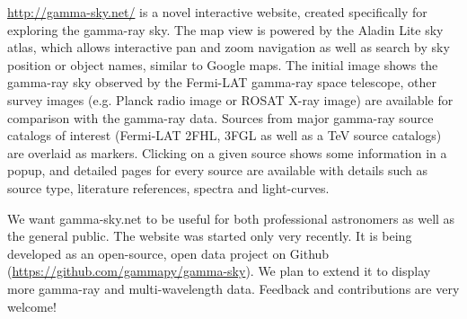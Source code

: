 \url{http://gamma-sky.net/} is a novel interactive website, created specifically for exploring the gamma-ray sky. The map view is powered by the Aladin Lite sky atlas, which allows interactive pan and zoom navigation as well as search by sky position or object names, similar to Google maps. The initial image shows the gamma-ray sky observed by the Fermi-LAT gamma-ray space telescope, other survey images (e.g. Planck radio image or ROSAT X-ray image) are available for comparison with the gamma-ray data.
Sources from major gamma-ray source catalogs of interest (Fermi-LAT 2FHL, 3FGL as well as a TeV source catalogs) are overlaid as markers. Clicking on a given source shows some information in a popup, and detailed pages for every source are available with details such as source type, literature references, spectra and light-curves.

We want gamma-sky.net to be useful for both professional astronomers as well as the general public. The website was started only very recently. It is being developed as an open-source, open data project on Github (\url{https://github.com/gammapy/gamma-sky}). We plan to extend it to display more gamma-ray and multi-wavelength data. Feedback and contributions are very welcome!
